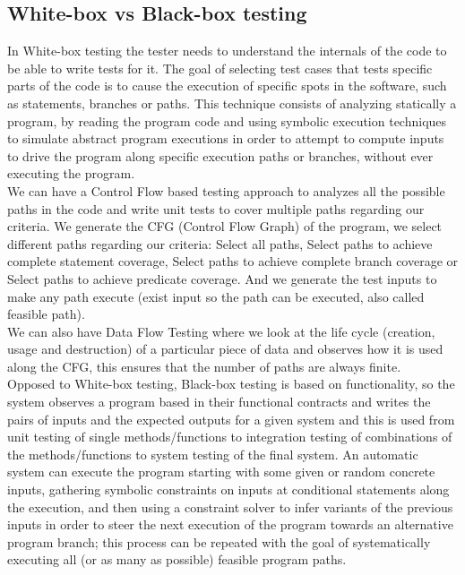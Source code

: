 \documentclass[10pt, conference, compsocconf]{IEEEtran}
\begin{document}
\subsection{White-box vs Black-box testing}
In White-box testing the tester needs to understand the internals of the code to be able to write tests for it.
The goal of selecting test cases that tests specific parts of the code is to cause the execution of specific spots in the software, such as statements, branches or
paths. This technique consists of analyzing statically a program, by reading the program code and using symbolic execution techniques to simulate abstract program
executions in order to attempt to compute inputs to drive the program along specific execution paths or branches, without ever executing the program.\\
We can have a Control Flow based testing approach to analyzes all the possible paths in the code and write unit tests to cover multiple paths regarding our criteria.
We generate the CFG (Control Flow Graph) of the program, we select different paths regarding our criteria:
Select all paths, Select paths to achieve complete statement coverage\cite{stt,Ntafos:1988:CST:630792.631017},
Select paths to achieve complete branch coverage\cite{Roper1994,stt}
or Select paths to achieve predicate coverage\cite{stt,Ntafos:1988:CST:630792.631017}.
And we generate the test inputs to make any path execute (exist input so the path can be executed, also called feasible path).\\
We can also have Data Flow Testing where we look at the life cycle (creation, usage and destruction) of a particular piece of data and observes how it is used along the CFG,
this ensures that the number of paths are always finite\cite{dataflow}.\\

Opposed to White-box testing, Black-box testing is based on functionality, so the system observes a program based in their functional contracts and writes the
pairs of inputs and the expected outputs for a given system and this is used from unit testing of single methods/functions to integration testing
of combinations of the methods/functions to system testing of the final system.
An automatic system can execute the program starting with some given or random concrete inputs, gathering symbolic constraints
on inputs at conditional statements along the execution, and then using a constraint solver to infer variants of the previous inputs in order
to steer the next execution of the program towards an alternative program branch; this process can be repeated with
the goal of systematically executing all (or as many as possible) feasible program paths.
\end{document}
